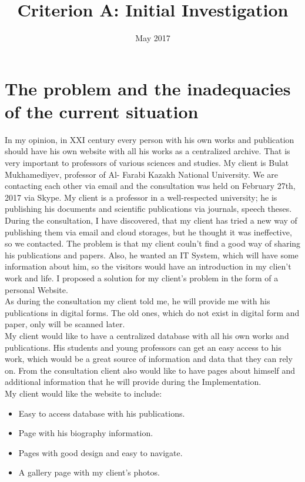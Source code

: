 \documentclass[a4paper]{article}
\title{Criterion A: Initial Investigation}
\date{May 2017}
\begin{document}
\maketitle
\section*{The problem and the inadequacies of the current situation}

In my opinion, in XXI century every person with his own works and publication should have his own website with all his works as a centralized archive. That is very important to professors of various sciences and studies. My client is Bulat Mukhamediyev, professor of Al- Farabi Kazakh National University. We are contacting each other via email and the consultation was held on February 27th, 2017 via Skype. My client is a professor in a well-respected university; he is publishing his documents and scientific publications via journals, speech theses. \\

During the consultation, I have discovered, that my client has tried a new way of publishing them via email and cloud storages, but he thought it was ineffective, so we contacted. The problem is that my client couln't find a good way of sharing his publications and papers. Also, he wanted an IT System, which will have some information about him, so the visitors would have an introduction in my clien't work and life. I proposed a solution for my client's problem in the form of a personal Website.\\

As during the consultation my client told me, he will provide me with his publications in digital forms. The old ones, which do not exist in digital form and paper, only will be scanned later.\\

My client would like to have a centralized database with all his own works and publications. His students and young professors can get an easy access to his work, which would be a great source of information and data that they can rely on. From the consultation client also would like to have pages about himself and additional information that he will provide during the Implementation.\\

My client would like the website to include:

\begin{itemize}
    \item Easy to access database with his publications.
    \item Page with his biography information.
    \item Pages with good design and easy to navigate.
    \item A gallery page with my client's photos.
\end{itemize}
\end{document}
